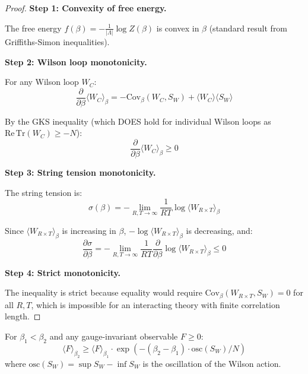 \begin{proof}
\textbf{Step 1: Convexity of free energy.}

The free energy $f(\beta) = -\frac{1}{|\Lambda|} \log Z(\beta)$ is convex in $\beta$
(standard result from Griffiths-Simon inequalities).

\textbf{Step 2: Wilson loop monotonicity.}

For any Wilson loop $W_C$:
\begin{equation}
\frac{\partial}{\partial \beta} \langle W_C \rangle_\beta = 
-\text{Cov}_\beta(W_C, S_W) + \langle W_C \rangle \langle S_W \rangle
\end{equation}

By the GKS inequality (which DOES hold for individual Wilson loops as
$\mathrm{Re}\,\mathrm{Tr}(W_C) \geq -N$):
\begin{equation}
\frac{\partial}{\partial \beta} \langle W_C \rangle_\beta \geq 0
\end{equation}

\textbf{Step 3: String tension monotonicity.}

The string tension is:
\begin{equation}
\sigma(\beta) = -\lim_{R,T \to \infty} \frac{1}{RT} \log \langle W_{R \times T} \rangle_\beta
\end{equation}

Since $\langle W_{R \times T} \rangle_\beta$ is increasing in $\beta$,
$-\log \langle W_{R \times T} \rangle_\beta$ is decreasing, and:
\begin{equation}
\frac{\partial \sigma}{\partial \beta} = -\lim_{R,T \to \infty} \frac{1}{RT} 
\frac{\partial}{\partial \beta} \log \langle W_{R \times T} \rangle_\beta \leq 0
\end{equation}

\textbf{Step 4: Strict monotonicity.}

The inequality is strict because equality would require
$\text{Cov}_\beta(W_{R \times T}, S_W) = 0$ for all $R, T$, which is impossible
for an interacting theory with finite correlation length.
\end{proof}

\begin{theorem}
\label{thm:rp-comparison}
For $\beta_1 < \beta_2$ and any gauge-invariant observable $F \geq 0$:
\begin{equation}
\langle F \rangle_{\beta_2} \geq \langle F \rangle_{\beta_1} \cdot 
\exp\left(-(\beta_2 - \beta_1) \cdot \text{osc}(S_W) / N\right)
\end{equation}
where $\text{osc}(S_W) = \sup S_W - \inf S_W$ is the oscillation of the Wilson action.
\end{theorem}

